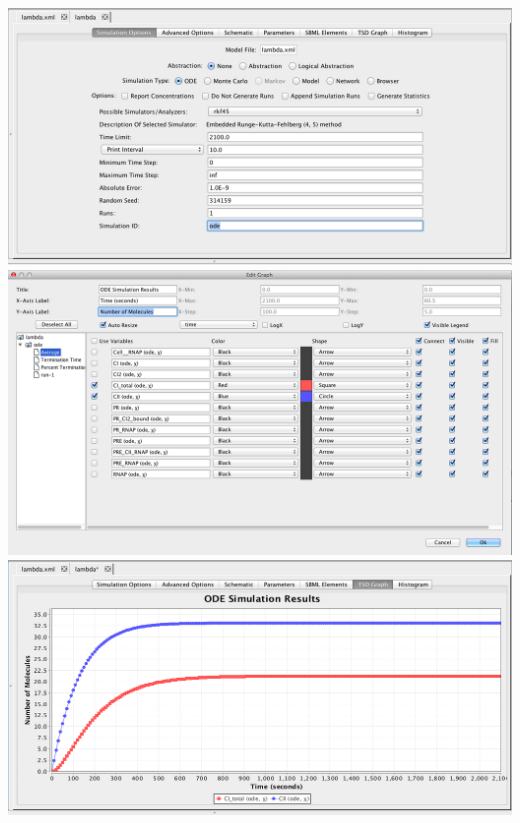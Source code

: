 \documentclass[titlepage,11pt]{article}
\begin{document}
\begin{center}
\includegraphics[width=160mm]{screenshots/odeSim}\\
\includegraphics[width=160mm]{screenshots/odeResults}\\
\includegraphics[width=160mm]{screenshots/odeSimResults}
\end{center}
\end{document}
